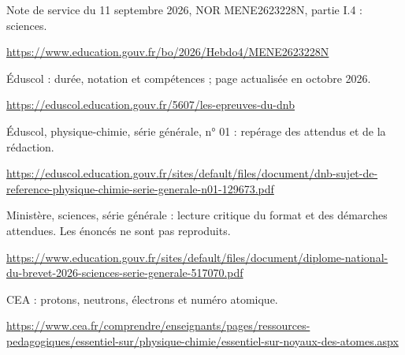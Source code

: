 \par\noindent\begin{minipage}{\linewidth}
Note de service du 11 septembre 2026, NOR MENE2623228N, partie I.4 : sciences.\par{\fontsize{8.5}{11}\selectfont\raggedright\url{https://www.education.gouv.fr/bo/2026/Hebdo4/MENE2623228N}\par}\end{minipage}\par
\par\noindent\begin{minipage}{\linewidth}
Éduscol : durée, notation et compétences ; page actualisée en octobre 2026.\par{\fontsize{8.5}{11}\selectfont\raggedright\url{https://eduscol.education.gouv.fr/5607/les-epreuves-du-dnb}\par}\end{minipage}\par
\par\noindent\begin{minipage}{\linewidth}
Éduscol, physique-chimie, série générale, n° 01 : repérage des attendus et de la rédaction.\par{\fontsize{8.5}{11}\selectfont\raggedright\url{https://eduscol.education.gouv.fr/sites/default/files/document/dnb-sujet-de-reference-physique-chimie-serie-generale-n01-129673.pdf}\par}\end{minipage}\par
{}
\par\noindent\begin{minipage}{\linewidth}
Ministère, sciences, série générale : lecture critique du format et des démarches attendues. Les énoncés ne sont pas reproduits.\par{\fontsize{8.5}{11}\selectfont\raggedright\url{https://www.education.gouv.fr/sites/default/files/document/diplome-national-du-brevet-2026-sciences-serie-generale-517070.pdf}\par}\end{minipage}\par
\par\noindent\begin{minipage}{\linewidth}
CEA : protons, neutrons, électrons et numéro atomique.\par{\fontsize{8.5}{11}\selectfont\raggedright\url{https://www.cea.fr/comprendre/enseignants/pages/ressources-pedagogiques/essentiel-sur/physique-chimie/essentiel-sur-noyaux-des-atomes.aspx}\par}\end{minipage}\par
